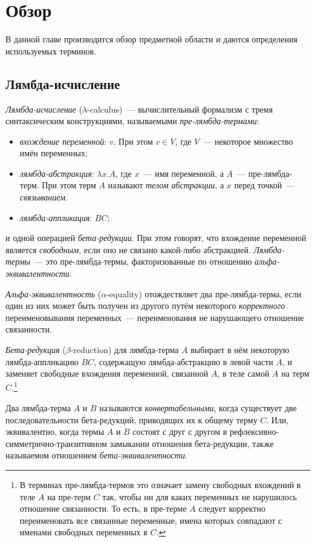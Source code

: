 \chapter{Обзор
}
\label{chapter1}

В данной главе производится обзор предметной области и даются определения используемых терминов.

\section{Лямбда-исчисление}

\emph{Лямбда-исчисление} ($\lambda$-calculus)~--- вычислительный формализм
с тремя синтаксическим конструкциями, называемыми \emph{пре-лямбда-термами}:
\begin{itemize}
\item \emph{вхождение переменной}: $v$. При этом $v \in V$, где $V$~--- некоторое множество имён переменных;
\item \emph{лямбда-абстракция}: $\lambda x.A$, где $x$~--- имя переменной, а $A$~--- пре-лямбда-терм. При этом терм $A$ называют \emph{телом абстракции}, а $x$ перед точкой~--- \emph{связыванием}.
\item \emph{лямбда-аппликация}: $B C$;
\end{itemize}
и одной операцией \emph{бета-редукции}.
При этом говорят, что вхождение переменной является \emph{свободным},
если оно не связано какой-либо абстракцией.
\emph{Лямбда-термы}~--- это пре-лямбда-термы, факторизованные по отношению \emph{альфа-эквивалентности}.

\emph{Альфа-эквивалентность} ($\alpha$-equality) отождествляет два пре-лямбда-терма, если один из них может быть получен из другого путём некоторого \emph{корректного} переименовывания переменных~--- переименования не нарушающего отношение связанности.

\emph{Бета-редукция} ($\beta$-reduction) для лямбда-терма $A$ выбирает в нём некоторую лямбда-аппликацию $B C$, содержащую лямбда-абстракцию в левой части $A$, и заменяет свободные вхождения переменной, связанной $A$, в теле самой $A$ на терм $C$.\footnote{В терминах пре-лямбда-термов это означает замену свободных вхождений в теле $A$ на пре-терм $C$ так, чтобы ни для каких переменных не нарушилось отношение связанности. То есть, в пре-терме $A$ следует корректно переименовать все связанные переменные, имена которых совпадают с именами свободных переменных в $C$.}

Два лямбда-терма $A$ и $B$ называются \emph{конвертабельными},
когда существует две последовательности бета-редукций, приводящих их к общему терму $C$.
Или, эквивалентно, когда термы $A$ и $B$ состоят с друг с другом в рефлексивно-симметрично-транзитивном замыкании отношения бета-редукции, также называемом отношением \emph{бета-эквивалентности}.

